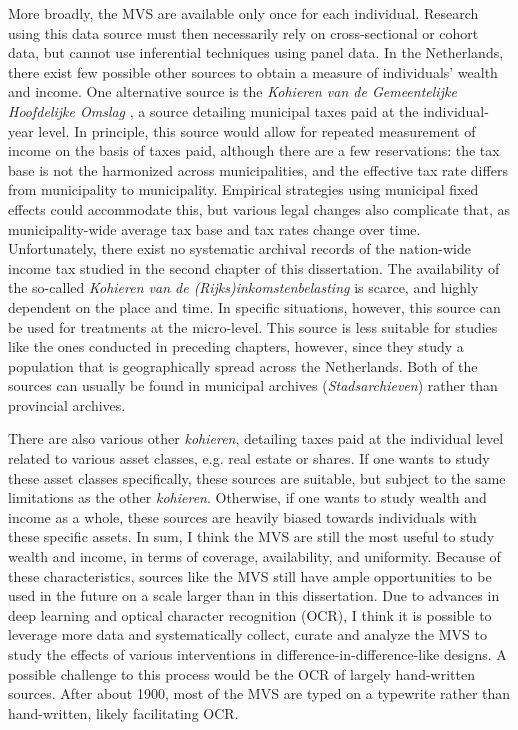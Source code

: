 More broadly, the MVS are available only once for each individual. Research using this data source must then necessarily rely on cross-sectional or cohort data, but cannot use inferential techniques using panel data. In the Netherlands, there exist few possible other sources to obtain a measure of individuals' wealth and income. One alternative source is the \textit{Kohieren van de Gemeentelijke Hoofdelijke Omslag} \citep{klep1987kohieren}, a source detailing municipal taxes paid at the individual-year level. In principle, this source would allow for repeated measurement of income on the basis of taxes paid, although there are a few reservations: the tax base is not the harmonized across municipalities, and the effective tax rate differs from municipality to municipality. Empirical strategies using municipal fixed effects could accommodate this, but various legal changes also complicate that, as municipality-wide average tax base and tax rates change over time. Unfortunately, there exist no systematic archival records of the nation-wide income tax studied in the second chapter of this dissertation. The availability of the so-called \textit{Kohieren van de (Rijks)inkomstenbelasting} is scarce, and highly dependent on the place and time. In specific situations, however, this source can be used for treatments at the micro-level. This source is less suitable for studies like the ones conducted in preceding chapters, however, since they study a population that is geographically spread across the Netherlands. Both of the sources can usually be found in municipal archives (\textit{Stadsarchieven}) rather than provincial archives. 

There are also various other \textit{kohieren}, detailing taxes paid at the individual level related to various asset classes, e.g. real estate or shares. If one wants to study these asset classes specifically, these sources are suitable, but subject to the same limitations as the other \textit{kohieren}. Otherwise, if one wants to study wealth and income as a whole, these sources are heavily biased towards individuals with these specific assets. In sum, I think the MVS are still the most useful to study wealth and income, in terms of coverage, availability, and uniformity. Because of these characteristics, sources like the MVS still have ample opportunities to be used in the future on a scale larger than in this dissertation. Due to advances in deep learning \citep{shen2021layoutparser} and optical character recognition (OCR), I think it is possible to leverage more data and systematically collect, curate and analyze the MVS to study the effects of various interventions in difference-in-difference-like designs. A possible challenge to this process would be the OCR of largely hand-written sources. After about 1900, most of the MVS are typed on a typewrite rather than hand-written, likely facilitating OCR. 

